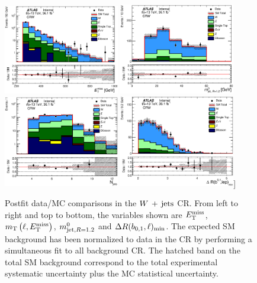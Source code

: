 \begin{figure}[!htb]
  \centering
  \includegraphics[width=0.45\textwidth]{figures/wJets/postfit/Met_CRW_log.eps}
    \includegraphics[width=0.45\textwidth]{figures/wJets/postfit/AntiKt12M_0__CRW.eps}
  \includegraphics[width=0.45\textwidth]{figures/wJets/postfit/NJets_CRW_log.eps}
  \includegraphics[width=0.45\textwidth]{figures/wJets/postfit/MinDRBLep_CRW.eps}]
  \caption{Postfit data/MC comparisons in the $W\,+\,\mathrm{jets}$ CR. From left to right and top to bottom, the variables shown are $E_{\mathrm{T}}^{\mathrm{miss}}$, $m_{\mathrm{T}}\left(\ell,E_{\mathrm{T}}^{\mathrm{miss}}\right)$, $m^{0}_{\mathrm{jet,}R=1.2}$ and $\Delta R(b_{0,1},\ell)_{\mathrm{min}}$. The expected SM background has been normalized to data in the CR by performing a simultaneous fit to all background CR.  The hatched band on the total SM background correspond to the total experimental systematic uncertainty plus the MC statistical uncertainty.}
  \label{fig:CRWpts}
\end{figure}


